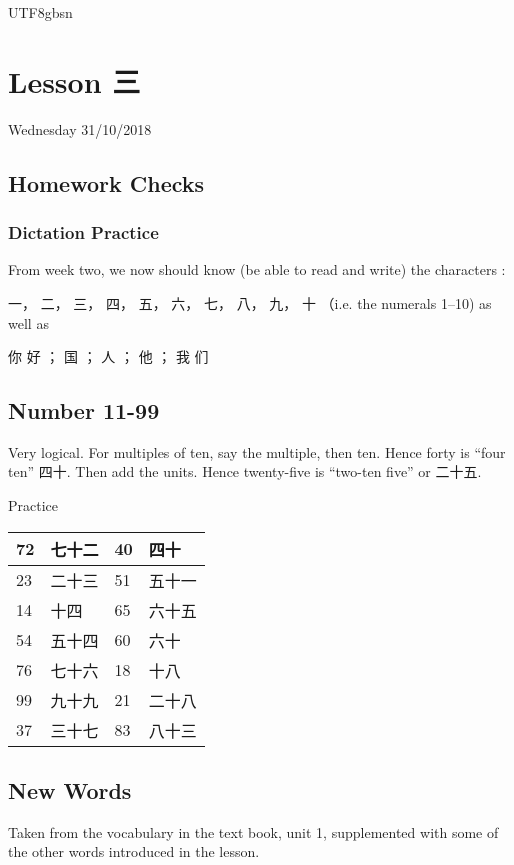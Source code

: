 \documentclass{article}
\newcommand{\myfont}{gbsn} %
\begin{document}
 
\begin{CJK}{UTF8}{\myfont} 
\section{Lesson 三}

Wednesday 31/10/2018

\subsection{Homework Checks}

\subsubsection{Dictation Practice}

From week two, we now should know (be able to read and write) the characters :

一， 二， 三， 四， 五， 六， 七， 八， 九， 十  （i.e. the numerals 1--10) as well as

你 好 ； 国 ； 人 ； 他 ； 我 们 

\subsection{Number 11-99}

Very logical.  For multiples of ten, say the multiple, then ten.  Hence forty is ``four ten'' 四十.  Then add the units.  Hence
twenty-five is ``two-ten five'' or 二十五.

Practice

\begin{tabular}{|l|l|l|l|} \hline
    72 & 七十二 & 40 & 四十  \\ \hline
    23 & 二十三 & 51 & 五十一 \\ \hline
    14 & 十四   & 65 & 六十五 \\ \hline
    54 & 五十四 & 60 & 六十 \\ \hline
    76 & 七十六 & 18 & 十八 \\ \hline
    99 & 九十九 & 21 & 二十八 \\ \hline
    37 & 三十七 & 83 & 八十三 \\ \hline
\end{tabular}

\subsection{New Words}

Taken from the vocabulary in the text book, unit 1, supplemented with some of the other words introduced in the lesson.


\end{CJK}
\end{document}
